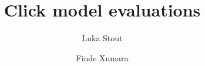 \documentclass{llncs} %
\title{
Click model evaluations
}
\author{
Luka Stout \and Finde Xumara
}
\institute{University of Amsterdam}
\begin{document}
\nocite{*}
\maketitle







{}


\newpage

\end{document}
